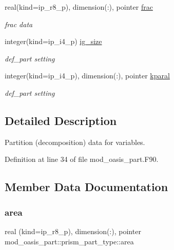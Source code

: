 \begin{DoxyCompactItemize}
real(kind=ip\+\_\+r8\+\_\+p), dimension(\+:), pointer \hyperlink{structmod__oasis__part_1_1prism__part__type_a7c4c3a1f31baa775401a067db8fa696f}{frac}
\begin{DoxyCompactList}\small\item\em frac data \end{DoxyCompactList}\item 
integer(kind=ip\+\_\+i4\+\_\+p) \hyperlink{structmod__oasis__part_1_1prism__part__type_a68188f6203fd3a54b307f3074cd01957}{ig\+\_\+size}
\begin{DoxyCompactList}\small\item\em def\+\_\+part setting \end{DoxyCompactList}\item 
integer(kind=ip\+\_\+i4\+\_\+p), dimension(\+:), pointer \hyperlink{structmod__oasis__part_1_1prism__part__type_a32de1a0439c69db4f6b4d42839ad4202}{kparal}
\begin{DoxyCompactList}\small\item\em def\+\_\+part setting \end{DoxyCompactList}\end{DoxyCompactItemize}


\subsection{Detailed Description}
Partition (decomposition) data for variables. 

Definition at line 34 of file mod\+\_\+oasis\+\_\+part.\+F90.



\subsection{Member Data Documentation}
\mbox{\label{structmod__oasis__part_1_1prism__part__type_ad8094acbe70644467444a8af6d0901e8}} 
\subsubsection{\texorpdfstring{area}{area}}
{\footnotesize\ttfamily real (kind=ip\+\_\+r8\+\_\+p), dimension(\+:), pointer mod\+\_\+oasis\+\_\+part\+::prism\+\_\+part\+\_\+type\+::area\hspace{0.3cm}{\ttfamily [private]}}




